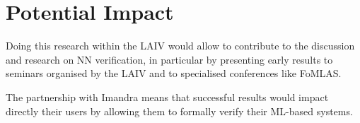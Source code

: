 \documentclass[]{article}
\begin{document}
\section{Potential Impact}
Doing this research within the LAIV would allow to contribute to the discussion and research on NN verification, in particular by presenting early results to seminars organised by the LAIV and to specialised conferences like FoMLAS.

The partnership with Imandra means that successful results would impact directly their users by allowing them to formally verify their ML-based systems.

 

\end{document}
